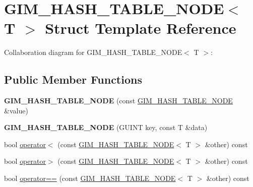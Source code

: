 \hypertarget{struct_g_i_m___h_a_s_h___t_a_b_l_e___n_o_d_e}{\section{G\+I\+M\+\_\+\+H\+A\+S\+H\+\_\+\+T\+A\+B\+L\+E\+\_\+\+N\+O\+D\+E$<$ T $>$ Struct Template Reference}
\label{struct_g_i_m___h_a_s_h___t_a_b_l_e___n_o_d_e}
}


Collaboration diagram for G\+I\+M\+\_\+\+H\+A\+S\+H\+\_\+\+T\+A\+B\+L\+E\+\_\+\+N\+O\+D\+E$<$ T $>$\+:
\subsection*{Public Member Functions}
\begin{DoxyCompactItemize}
\item 
\hypertarget{struct_g_i_m___h_a_s_h___t_a_b_l_e___n_o_d_e_abcc41d98b6e27056b35eb6eed0031ebd}{{\bfseries G\+I\+M\+\_\+\+H\+A\+S\+H\+\_\+\+T\+A\+B\+L\+E\+\_\+\+N\+O\+D\+E} (const \hyperlink{struct_g_i_m___h_a_s_h___t_a_b_l_e___n_o_d_e}{G\+I\+M\+\_\+\+H\+A\+S\+H\+\_\+\+T\+A\+B\+L\+E\+\_\+\+N\+O\+D\+E} \&value)}\label{struct_g_i_m___h_a_s_h___t_a_b_l_e___n_o_d_e_abcc41d98b6e27056b35eb6eed0031ebd}

\item 
\hypertarget{struct_g_i_m___h_a_s_h___t_a_b_l_e___n_o_d_e_a1aa08db268159b479a70df1f520f0519}{{\bfseries G\+I\+M\+\_\+\+H\+A\+S\+H\+\_\+\+T\+A\+B\+L\+E\+\_\+\+N\+O\+D\+E} (G\+U\+I\+N\+T key, const T \&data)}\label{struct_g_i_m___h_a_s_h___t_a_b_l_e___n_o_d_e_a1aa08db268159b479a70df1f520f0519}

\item 
bool \hyperlink{struct_g_i_m___h_a_s_h___t_a_b_l_e___n_o_d_e_a749d9fcc3bf226efd2b7ef5c087024c2}{operator$<$} (const \hyperlink{struct_g_i_m___h_a_s_h___t_a_b_l_e___n_o_d_e}{G\+I\+M\+\_\+\+H\+A\+S\+H\+\_\+\+T\+A\+B\+L\+E\+\_\+\+N\+O\+D\+E}$<$ T $>$ \&other) const 
\item 
bool \hyperlink{struct_g_i_m___h_a_s_h___t_a_b_l_e___n_o_d_e_aa4f81b304007f07537b94b86ac0afd56}{operator$>$} (const \hyperlink{struct_g_i_m___h_a_s_h___t_a_b_l_e___n_o_d_e}{G\+I\+M\+\_\+\+H\+A\+S\+H\+\_\+\+T\+A\+B\+L\+E\+\_\+\+N\+O\+D\+E}$<$ T $>$ \&other) const 
\item 
bool \hyperlink{struct_g_i_m___h_a_s_h___t_a_b_l_e___n_o_d_e_acb122103c5286ec93386694ccbefec20}{operator==} (const \hyperlink{struct_g_i_m___h_a_s_h___t_a_b_l_e___n_o_d_e}{G\+I\+M\+\_\+\+H\+A\+S\+H\+\_\+\+T\+A\+B\+L\+E\+\_\+\+N\+O\+D\+E}$<$ T $>$ \&other) const 
\end{DoxyCompactItemize}
